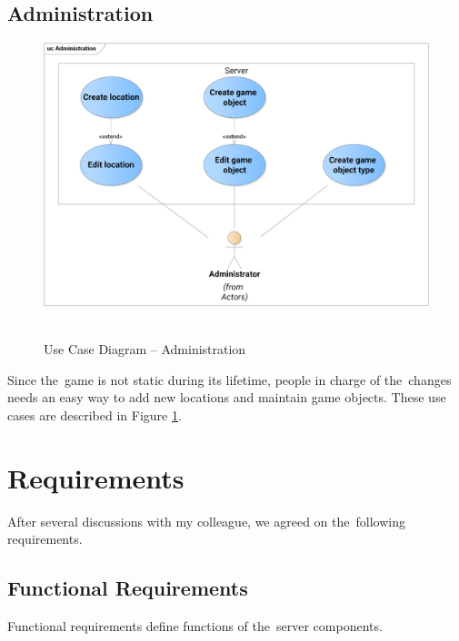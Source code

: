 	\subsection{Administration}
	\begin{figure}[h]	
		\includegraphics[width=\textwidth]{figures/UC_Administration}
		\centering			\
		\caption{Use Case Diagram -- Administration}
		\label{fig:ucadmin}				
	\end{figure}	
	\noindent Since the~game is not static during its lifetime, people in charge of the~changes needs an easy way to add new locations and maintain game objects. These use cases are described in Figure \ref{fig:ucadmin}.
	
	
\section{Requirements}
\label{section:requirements}
After several discussions with my colleague, we agreed on the~following requirements.

	\subsection{Functional Requirements}
	\label{section:fr}
	Functional requirements define functions of the~server components.
